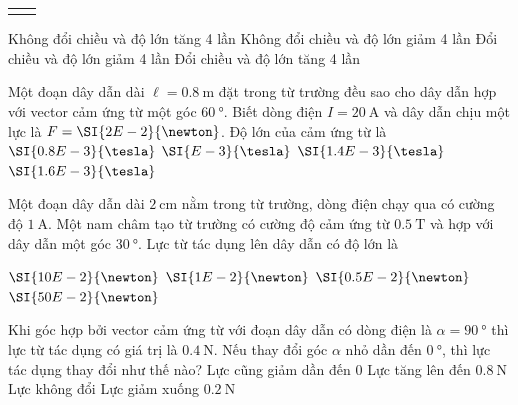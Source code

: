 \begin{ex}
\begin{center}
\begin{tabular}{M{8cm}M{8cm}}
			\label{fig:18P-12}
		\end{tabular}
	\end{center}
	\choice
	{Không đổi chiều và độ lớn tăng 4 lần}
	{\True Không đổi chiều và độ lớn giảm 4 lần}
	{Đổi chiều và độ lớn giảm 4 lần}
	{Đổi chiều và độ lớn tăng 4 lần}
\end{ex}


\begin{ex}
	Một đoạn dây dẫn dài $\ell=\SI{0.8}{\meter}$ đặt trong từ trường đều sao cho dây dẫn hợp với vector cảm ứng từ một góc $\SI{60}{\degree}$. Biết dòng điện $I=\SI{20}{\ampere}$ và dây dẫn chịu một lực là $F=\SI{2E-2}{\newton}$. Độ lớn của cảm ứng từ là
	\choice
	{$\SI{0.8E-3}{\tesla}$}
	{$\SI{E-3}{\tesla}$}
	{\True $\SI{1.4E-3}{\tesla}$}
	{$\SI{1.6E-3}{\tesla}$}
\end{ex}

\begin{ex}
Một đoạn dây dẫn dài $\SI{2}{\centi\meter}$ nằm trong từ trường, dòng điện chạy qua có cường độ $\SI{1}{\ampere}$. Một nam châm tạo từ trường có cường độ cảm ứng từ $\SI{0.5}{\tesla}$ và hợp với dây dẫn một góc $\SI{30}{\degree}$. Lực từ tác dụng lên dây dẫn có độ lớn là

	\choice
	{$\SI{10E-2}{\newton}$}
	{$\SI{1E-2}{\newton}$}
	{\True $\SI{0.5E-2}{\newton}$}
	{$\SI{50E-2}{\newton}$}
\end{ex}
\begin{ex}
	Khi góc hợp bởi vector cảm ứng từ với đoạn dây dẫn có dòng điện là $\alpha=\SI{90}{\degree}$ thì lực từ tác dụng có giá trị là $\SI{0.4}{\newton}$. Nếu thay đổi góc $\alpha$ nhỏ dần đến $\SI{0}{\degree}$, thì lực tác dụng thay đổi như thế nào?
	\choice
	{\True Lực cũng giảm dần đến 0}
	{Lực tăng lên đến $\SI{0.8}{\newton}$}
	{Lực không đổi}
	{Lực giảm xuống $\SI{0.2}{\newton}$}
	\loigiai{}
\end{ex}

